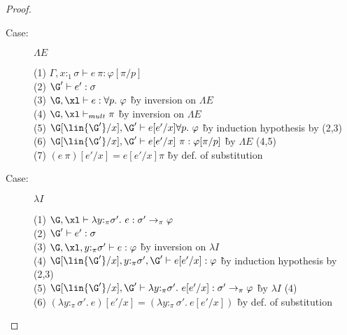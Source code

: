 \begin{proof}
\begin{description}
\item[Case:] $\Lambda E$
\begin{tabbing}
  (1) $\Gamma, x{:}_1\sigma \vdash e~\pi: \varphi[\pi/p]$\\
  (2) $\G' \vdash e' : \sigma$\\
  (3) $\G, \xl \vdash e : \forall p.~\varphi$ \` by inversion on $\Lambda E$\\
  (4) $\G, \xl \vdash_{mult} \pi$ \` by inversion on $\Lambda E$\\
  (5) $\G[\lin{\G'}/x], \G' \vdash e[e'/x] \forall p.~\varphi$ \` by induction hypothesis by (2,3)\\
  (6) $\G[\lin{\G'}/x], \G' \vdash e[e'/x]~\pi : \varphi[\pi/p]$ \` by $\Lambda E$ (4,5)\\
  (7) $(e~\pi)[e'/x] = e[e'/x] \pi$ \` by def. of substitution\\
\end{tabbing}

\item[Case:] $\lambda I$
\begin{tabbing}
  (1) $\G, \xl \vdash \lambda y{:}_\pi\sigma'.~e : \sigma' \to_\pi \varphi$\\
  (2) $\G' \vdash e' : \sigma$\\
  (3) $\G, \xl, y{:}_\pi\sigma' \vdash e : \varphi$ \` by inversion on $\lambda I$\\
  (4) $\G[\lin{\G'}/x], y{:}_\pi\sigma', \G' \vdash e[e'/x] : \varphi$ \` by induction hypothesis by (2,3)\\
  (5) $\G[\lin{\G'}/x], \G' \vdash \lambda y{:}_\pi\sigma'.~e[e'/x] : \sigma' \to_\pi \varphi$ \` by $\lambda I$ (4)\\
  (6) $(\lambda y{:}_\pi\sigma'.~e)[e'/x] = (\lambda y{:}_\pi\sigma'.~e[e'/x])$ \` by def. of substitution\\
\end{tabbing}


\end{description}
\end{proof}
